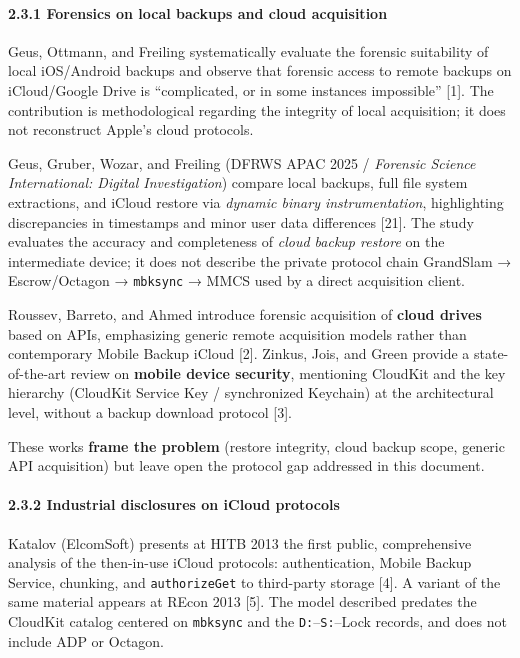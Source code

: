 \documentclass[
  english,
  10pt]{article}
\begin{document}
\paragraph{2.3.1 Forensics on local backups and cloud
acquisition}\label{forensics-on-local-backups-and-cloud-acquisition}

Geus, Ottmann, and Freiling systematically evaluate the forensic
suitability of local iOS/Android backups and observe that forensic
access to remote backups on iCloud/Google Drive is ``complicated, or in
some instances impossible'' {[}1{]}. The contribution is methodological
regarding the integrity of local acquisition; it does not reconstruct
Apple's cloud protocols.

Geus, Gruber, Wozar, and Freiling (DFRWS APAC 2025 / \emph{Forensic
Science International: Digital Investigation}) compare local backups,
full file system extractions, and iCloud restore via \emph{dynamic
binary instrumentation}, highlighting discrepancies in timestamps and
minor user data differences {[}21{]}. The study evaluates the accuracy
and completeness of \emph{cloud backup restore} on the intermediate
device; it does not describe the private protocol chain GrandSlam →
Escrow/Octagon → \texttt{mbksync} → MMCS used by a direct acquisition
client.

Roussev, Barreto, and Ahmed introduce forensic acquisition of
\textbf{cloud drives} based on APIs, emphasizing generic remote
acquisition models rather than contemporary Mobile Backup iCloud
{[}2{]}. Zinkus, Jois, and Green provide a state-of-the-art review on
\textbf{mobile device security}, mentioning CloudKit and the key
hierarchy (CloudKit Service Key / synchronized Keychain) at the
architectural level, without a backup download protocol {[}3{]}.

These works \textbf{frame the problem} (restore integrity, cloud backup
scope, generic API acquisition) but leave open the protocol gap
addressed in this document.

\paragraph{2.3.2 Industrial disclosures on iCloud
protocols}\label{industrial-disclosures-on-icloud-protocols}

Katalov (ElcomSoft) presents at HITB 2013 the first public,
comprehensive analysis of the then-in-use iCloud protocols:
authentication, Mobile Backup Service, chunking, and
\texttt{authorizeGet} to third-party storage {[}4{]}. A variant of the
same material appears at REcon 2013 {[}5{]}. The model described
predates the CloudKit catalog centered on \texttt{mbksync} and the
\texttt{D:}--\texttt{S:}--Lock records, and does not include ADP or
Octagon.
\end{document}
